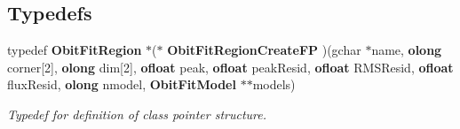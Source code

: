 \subsection*{Typedefs}
\begin{CompactItemize}
\item 
typedef {\bf Obit\-Fit\-Region} $\ast$($\ast$ {\bf Obit\-Fit\-Region\-Create\-FP} )(gchar $\ast$name, {\bf olong} corner[2], {\bf olong} dim[2], {\bf ofloat} peak, {\bf ofloat} peak\-Resid, {\bf ofloat} RMSResid, {\bf ofloat} flux\-Resid, {\bf olong} nmodel, {\bf Obit\-Fit\-Model} $\ast$$\ast$models)
\begin{CompactList}\small\item\em Typedef for definition of class pointer structure. \item\end{CompactList}\end{CompactItemize}
